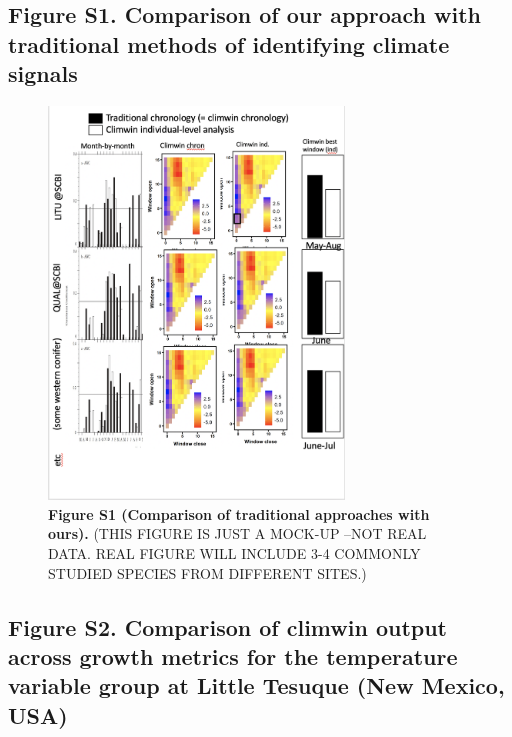 \documentclass[
]{article}
\begin{document}
\newpage

\hypertarget{figure-s1.-comparison-of-our-approach-with-traditional-methods-of-identifying-climate-signals}{%
\subsection{Figure S1. Comparison of our approach with traditional
methods of identifying climate
signals}\label{figure-s1.-comparison-of-our-approach-with-traditional-methods-of-identifying-climate-signals}}

\begin{figure}
\centering
\includegraphics[width=0.7\textwidth,height=\textheight]{tables_figures/mock_comparison_traditional_method.png}
\caption{\textbf{Figure S1 \textbar{} (Comparison of traditional
approaches with ours).} (THIS FIGURE IS JUST A MOCK-UP --NOT REAL DATA.
REAL FIGURE WILL INCLUDE 3-4 COMMONLY STUDIED SPECIES FROM DIFFERENT
SITES.)}
\end{figure}

\newpage

\hypertarget{figure-s2.-comparison-of-climwin-output-across-growth-metrics-for-the-temperature-variable-group-at-little-tesuque-new-mexico-usa}{%
\subsection{Figure S2. Comparison of climwin output across growth
metrics for the temperature variable group at Little Tesuque (New
Mexico,
USA)}\label{figure-s2.-comparison-of-climwin-output-across-growth-metrics-for-the-temperature-variable-group-at-little-tesuque-new-mexico-usa}}
\end{document}
